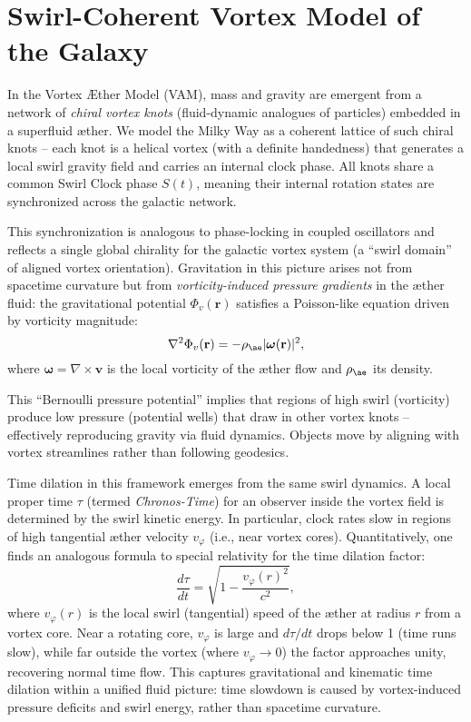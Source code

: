 \section*{Swirl-Coherent Vortex Model of the Galaxy}

In the Vortex \AE ther Model (VAM), mass and gravity are emergent from a network of \emph{chiral vortex knots} (fluid-dynamic analogues of particles) embedded in a superfluid \ae ther. We model the Milky Way as a coherent lattice of such chiral knots -- each knot is a helical vortex (with a definite handedness) that generates a local swirl gravity field and carries an internal clock phase. All knots share a common Swirl Clock phase $S(t)$, meaning their internal rotation states are synchronized across the galactic network\cite{iskandarani2025vam2}.

This synchronization is analogous to phase-locking in coupled oscillators and reflects a single global chirality for the galactic vortex system (a ``swirl domain'' of aligned vortex orientation). Gravitation in this picture arises not from spacetime curvature but from \emph{vorticity-induced pressure gradients} in the \ae ther fluid: the gravitational potential $\Phi_v(\mathbf{r})$ satisfies a Poisson-like equation driven by vorticity magnitude\cite{iskandarani2025vam2}:
\begin{equation}
\nabla^2 \Phi_v(\mathbf{r}) = -\rho_{\ae} |\boldsymbol{\omega}(\mathbf{r})|^2,
\label{eq:swirl-grav}
\end{equation}
where $\boldsymbol{\omega}=\nabla\times \mathbf{v}$ is the local vorticity of the \ae ther flow and $\rho_{\ae}$ its density\cite{iskandarani2025vam2}.

This ``Bernoulli pressure potential'' implies that regions of high swirl (vorticity) produce low pressure (potential wells) that draw in other vortex knots -- effectively reproducing gravity via fluid dynamics. Objects move by aligning with vortex streamlines rather than following geodesics\cite{iskandarani2025vam2}.

Time dilation in this framework emerges from the same swirl dynamics. A local proper time $\tau$ (termed \emph{Chronos-Time}) for an observer inside the vortex field is determined by the swirl kinetic energy. In particular, clock rates slow in regions of high tangential \ae ther velocity $v_{\varphi}$ (i.e., near vortex cores). Quantitatively, one finds an analogous formula to special relativity for the time dilation factor:
\begin{equation}
\frac{d\tau}{dt} = \sqrt{1 - \frac{v_{\varphi}(r)^2}{c^2}},
\label{eq:swirl-time}
\end{equation}
where $v_{\varphi}(r)$ is the local swirl (tangential) speed of the \ae ther at radius $r$ from a vortex core. Near a rotating core, $v_{\varphi}$ is large and $d\tau/dt$ drops below 1 (time runs slow), while far outside the vortex (where $v_{\varphi}\to 0$) the factor approaches unity, recovering normal time flow. This captures gravitational and kinematic time dilation within a unified fluid picture: time slowdown is caused by vortex-induced pressure deficits and swirl energy, rather than spacetime curvature\cite{iskandarani2025vam2}.

